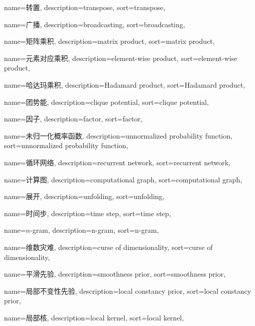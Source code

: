 {
  name=转置,
  description={transpose},
  sort={transpose},
}

{
  name=广播,
  description={broadcasting},
  sort={broadcasting},
}

{
  name=矩阵乘积,
  description={matrix product},
  sort={matrix product},
}

{
  name=元素对应乘积,
  description={element-wise product},
  sort={element-wise product},
}

{
  name=哈达玛乘积,
  description={Hadamard product},
  sort={Hadamard product},
}

{
  name=团势能,
  description={clique potential},
  sort={clique potential},
}

{
  name=因子,
  description={factor},
  sort={factor},
}

{
  name=未归一化概率函数,
  description={unnormalized probability function},
  sort={unnormalized probability function},
}

{
  name=循环网络,
  description={recurrent network},
  sort={recurrent network},
}

{
  name=计算图,
  description={computational graph},
  sort={computational graph},
}

{
  name=展开,
  description={unfolding},
  sort={unfolding},
}

{
  name=时间步,
  description={time step},
  sort={time step},
}

{
  name=$n$-gram,
  description={n-gram},
  sort={n-gram},
}

{
  name=维数灾难,
  description={curse of dimensionality},
  sort={curse of dimensionality},
}

{
  name=平滑先验,
  description={smoothness prior},
  sort={smoothness prior},
}

{
  name=局部不变性先验,
  description={local constancy prior},
  sort={local constancy prior},
}

{
  name=局部核,
  description={local kernel},
  sort={local kernel},
}

